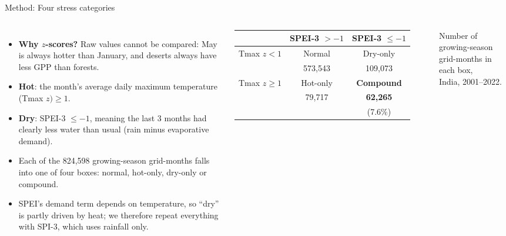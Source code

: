 \documentclass[aspectratio=169,xcolor=table]{beamer}
\begin{document}
\begin{frame}{Method: Four stress categories}
\begin{columns}[c]
\small
\begin{itemize}
  \item \textbf{Why $z$-scores?} Raw values cannot be compared: May is
    always hotter than January, and deserts always have less GPP than
    forests.
  \item \textbf{Hot}: the month's average daily maximum temperature (Tmax $z) \ge 1$.
  \item \textbf{Dry}: SPEI-3 $\le -1$, meaning the last 3 months had clearly
    less water than usual (rain minus evaporative demand).
  \item Each of the 824,598 growing-season grid-months falls into one of
    four boxes: normal, hot-only, dry-only or compound.
  \item SPEI's demand term depends on temperature, so ``dry'' is partly
    driven by heat; we therefore repeat everything with SPI-3, which uses
    rainfall only.
\end{itemize}
\centering\footnotesize
\begin{tabular}{c|c|c}
 & SPEI-3 $>-1$ & SPEI-3 $\le-1$ \\ \hline
Tmax $z<1$   & Normal   & Dry-only \\
             & 573,543  & 109,073 \\ \hline
Tmax $z\ge1$ & Hot-only & \textbf{Compound} \\
             & 79,717   & \textbf{62,265} \\
             &          & (7.6\%) \\
\end{tabular}

\vspace{6pt}
\scriptsize Number of growing-season grid-months in each box,\\
India, 2001--2022.
\end{columns}
\end{frame}
\end{document}
